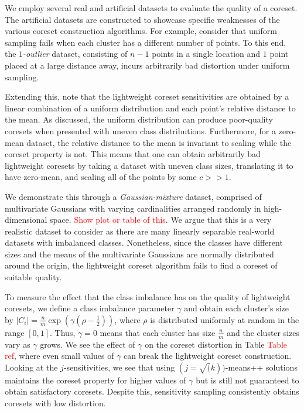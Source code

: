 We employ several real and artificial datasets to evaluate the quality of a coreset.  The artificial datasets are constructed to showcase specific weaknesses of
the various coreset construction algorithms. For example, consider that uniform sampling fails when each cluster has a different number of points. To this end,
the \emph{$1$-outlier} dataset, consisting of $n-1$ points in a single location and $1$ point placed at a large distance away, incurs arbitrarily bad distortion
under uniform sampling. 

Extending this, note that the lightweight coreset sensitivities are obtained by a linear combination of a uniform distribution and each point's relative
distance to the mean. As discussed, the uniform distribution can produce poor-quality coresets when presented with uneven class distributions. Furthermore, for
a zero-mean dataset, the relative distance to the mean is invariant to scaling while the coreset property is not. This means that one can obtain arbitrarily
bad lightweight coresets by taking a dataset with uneven class sizes, translating it to have zero-mean, and scaling all of the points by some $c >> 1$.

We demonstrate this through a \emph{Gaussian-mixture} dataset, comprised of multivariate Gaussians with varying cardinalities arranged randomly in
high-dimensional space. \textcolor{red}{Show plot or table of this}. We argue that this is a very realistic dataset to consider as there are many linearly
separable real-world datasets with imbalanced classes. Nonetheless, since the classes have different sizes and the means of the multivariate Gaussians are
normally distributed around the origin, the lightweight coreset algorithm fails to find a coreset of suitable quality. 

To measure the effect that the class imbalance has on the quality of lightweight coresets, we define a class imbalance parameter $\gamma$ and obtain each
cluster's size by $|C_i| = \frac{n}{m} \exp \left( \gamma(\rho - \frac{1}{2}) \right)$, where $\rho$ is distributed uniformly at random in the range $[0, 1]$.
Thus, $\gamma = 0$ means that each cluster has size $\frac{n}{m}$ and the cluster sizes vary as $\gamma$ grows. We see the effect of $\gamma$ on the coreset
distortion in Table \textcolor{red}{Table ref}, where even small values of $\gamma$ can break the lightweight coreset construction. Looking at the
$j$-sensitivities, we see that using $(j=\sqrt(k))$-means++ solutions maintains the coreset property for higher values of $\gamma$ but is still not guaranteed
to obtain satisfactory coresets. Despite this, sensitivity sampling consistently obtains coresets with low distortion.


